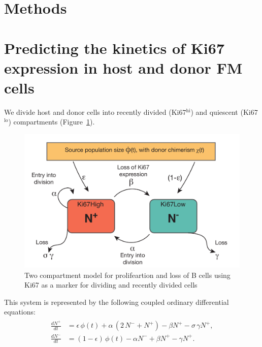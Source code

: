 \documentclass[11pt]{article}
\newcommand{\khi}{Ki67$^\text{hi}$}
\newcommand{\klo}{Ki67$^\text{lo}$}
\begin{document}
\clearpage

\section*{Methods}

\section*{Predicting the kinetics of Ki67 expression in host and donor FM cells}

We divide host and donor cells into recently divided (\khi) and quiescent (\klo) compartments (Figure~\ref{fig:Ki67schematic}).

\begin{figure}[htbp]
	\centerline{\includegraphics[scale = 0.5] {TwoComp_ki67.pdf}}
	\caption{Two compartment model for prolifeartion and loss of B cells using Ki67 as a marker for dividing and recently divided cells \label{fig:Ki67schematic}}
\end{figure}

This system is represented by the following coupled ordinary differential equations:
\begin{eqnarray}
\begin{aligned}
\frac{dN^+}{dt} &= \epsilon \, \phi(t) + \alpha \, (2\, N^- + N^+) - \beta N^+ - \sigma \, \gamma N^+ ,\\
\frac{dN^-}{dt} &=  (1-\epsilon) \, \phi(t) - \alpha N^-  + \beta N^+ - \gamma  N^+.
\end{aligned}
\label{eq:ode_ki67}
\end{eqnarray}
\end{document}
